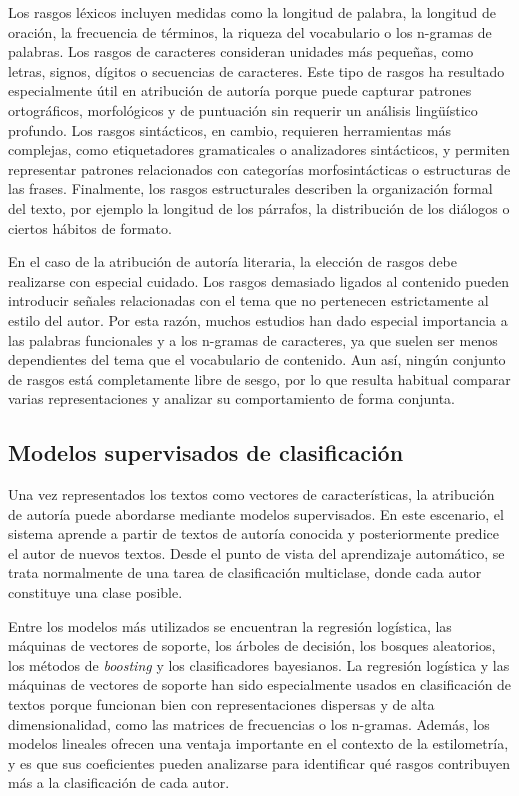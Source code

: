 \documentclass[IB]{TFUOC}%
\begin{document}
Los rasgos léxicos incluyen medidas como la longitud de palabra, la longitud de oración, la frecuencia de términos, la riqueza del vocabulario o los n-gramas de palabras. Los rasgos de caracteres consideran unidades más pequeñas, como letras, signos, dígitos o secuencias de caracteres. Este tipo de rasgos ha resultado especialmente útil en atribución de autoría porque puede capturar patrones ortográficos, morfológicos y de puntuación sin requerir un análisis lingüístico profundo. Los rasgos sintácticos, en cambio, requieren herramientas más complejas, como etiquetadores gramaticales o analizadores sintácticos, y permiten representar patrones relacionados con categorías morfosintácticas o estructuras de las frases. Finalmente, los rasgos estructurales describen la organización formal del texto, por ejemplo la longitud de los párrafos, la distribución de los diálogos o ciertos hábitos de formato.

En el caso de la atribución de autoría literaria, la elección de rasgos debe realizarse con especial cuidado. Los rasgos demasiado ligados al contenido pueden introducir señales relacionadas con el tema que no pertenecen estrictamente al estilo del autor. Por esta razón, muchos estudios han dado especial importancia a las palabras funcionales y a los n-gramas de caracteres, ya que suelen ser menos dependientes del tema que el vocabulario de contenido. Aun así, ningún conjunto de rasgos está completamente libre de sesgo, por lo que resulta habitual comparar varias representaciones y analizar su comportamiento de forma conjunta.

\subsection{Modelos supervisados de clasificación}

Una vez representados los textos como vectores de características, la atribución de autoría puede abordarse mediante modelos supervisados. En este escenario, el sistema aprende a partir de textos de autoría conocida y posteriormente predice el autor de nuevos textos. Desde el punto de vista del aprendizaje automático, se trata normalmente de una tarea de clasificación multiclase, donde cada autor constituye una clase posible\cite{stamatatos2009survey}.

Entre los modelos más utilizados se encuentran la regresión logística, las máquinas de vectores de soporte, los árboles de decisión, los bosques aleatorios, los métodos de \textit{boosting} y los clasificadores bayesianos. La regresión logística y las máquinas de vectores de soporte han sido especialmente usados en clasificación de textos porque funcionan bien con representaciones dispersas y de alta dimensionalidad, como las matrices de frecuencias o los n-gramas. Además, los modelos lineales ofrecen una ventaja importante en el contexto de la estilometría, y es que sus coeficientes pueden analizarse para identificar qué rasgos contribuyen más a la clasificación de cada autor.
\end{document}
